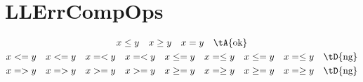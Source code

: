 \section{LLErrCompOps}

\begin{gather*}
	x \leq y \quad
	x \geq y \quad
	x = y \quad
	\text{\tA{ok}} \\
	x <= y \quad
	x < = y \quad
	x =< y \quad
	x = < y \quad
	x \le = y \quad
	x = \le y \quad
	x \leq = y \quad
	x = \leq y \quad
	\text{\tD{ng}} \\
	x => y \quad
	x = > y \quad
	x >= y \quad
	x > = y \quad
	x \ge = y \quad
	x = \ge y \quad
	x \geq = y \quad
	x = \geq y \quad
	\text{\tD{ng}}
\end{gather*}
